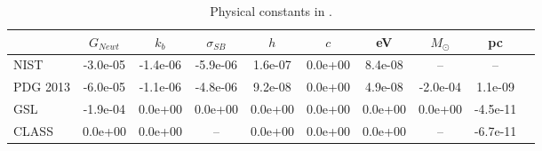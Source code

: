 \begin{table}
  \begin{center}
  \caption{Physical constants in \ccl. \label{tab:constants}}
  \begin{tabular}{lccccccccc}
\hline\hline
 & $G_{Newt}$ & $k_b$ & $\sigma_{SB}$ & $h$ & $c$ & eV  & $M_\odot$ & pc \\ 
\hline
NIST & -3.0e-05 & -1.4e-06 & -5.9e-06 & 1.6e-07 & 0.0e+00 & 8.4e-08 & \--- & \--- \\[3pt]
 PDG 2013 & -6.0e-05 & -1.1e-06 & -4.8e-06 & 9.2e-08 & 0.0e+00 & 4.9e-08 & -2.0e-04 & 1.1e-09 \\[3pt] 
GSL & -1.9e-04 & 0.0e+00 & 0.0e+00 & 0.0e+00 & 0.0e+00 & 0.0e+00 & 0.0e+00 & -4.5e-11 \\ [3pt]
CLASS & 0.0e+00 & 0.0e+00 & \--- & 0.0e+00 & 0.0e+00 & 0.0e+00 & \--- & -6.7e-11 
\\\hline\hline
\end{tabular}
\end{center}
\end{table}

